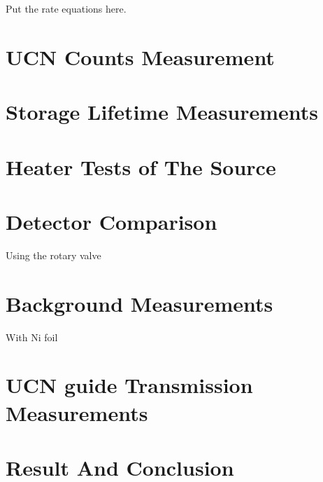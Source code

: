 Put the rate equations here.
\section{UCN Counts Measurement}



\section{Storage Lifetime Measurements}

\section{Heater Tests of The Source}

\section{Detector Comparison}
Using the rotary valve

\section{Background Measurements}
With Ni foil

\section{UCN guide Transmission Measurements}

\section{Result And Conclusion}

  
  
  

